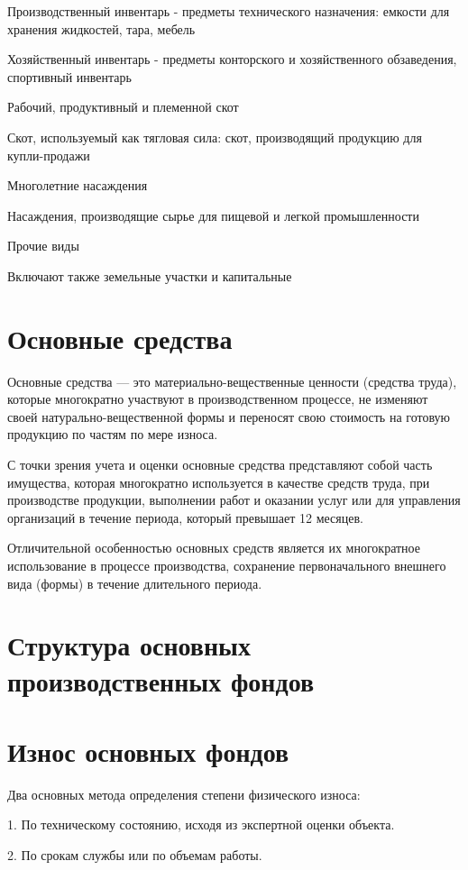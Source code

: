 Производственный инвентарь - предметы технического назначения: емкости для
хранения жидкостей, тара, мебель

Хозяйственный инвентарь - предметы конторского и хозяйственного обзаведения,
спортивный инвентарь

Рабочий, продуктивный и племенной скот

Скот, используемый как тягловая сила: скот, производящий продукцию для
купли-продажи

Многолетние насаждения

Насаждения, производящие сырье для пищевой и легкой промышленности

Прочие виды

Включают также земельные участки и капитальные

\section{Основные средства}

Основные средства --- это материально-вещественные ценности (средства труда),
которые многократно участвуют в производственном процессе, не изменяют своей
натурально-вещественной формы и переносят свою стоимость на готовую продукцию по
частям по мере износа.

С точки зрения учета и оценки основные средства представляют собой часть
имущества, которая многократно используется в качестве средств труда, при
производстве продукции, выполнении работ и оказании услуг или для управления
организаций в течение периода, который превышает 12 месяцев.

Отличительной особенностью основных средств является их многократное
использование в процессе производства, сохранение первоначального внешнего вида
(формы) в течение длительного периода.

\section{Структура основных производственных фондов}

\section{Износ основных фондов}

Два основных метода определения степени физического износа:

1. По техническому состоянию, исходя из экспертной оценки объекта.

2. По срокам службы или по объемам работы.

